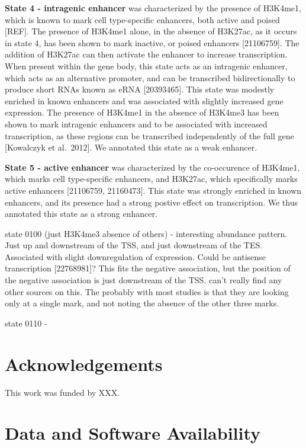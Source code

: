 \documentclass[10pt,letterpaper]{article}
\begin{document}
\textbf{State 4 - intragenic enhancer} was characterized by the presence
of H3K4me1, which is known to mark cell type-specific enhancers, both
active and poised {[}REF{]}. The presence of H3K4me1 alone, in the
absence of H3K27ac, as it occurs in state 4, has been shown to mark
inactive, or poised enhancers {[}21106759{]}. The addition of H3K27ac
can then activate the enhancer to increase transcription. When present
within the gene body, this state acts as an intragenic enhancer, which
acts as an alternative promoter, and can be transcribed bidirectionally
to produce short RNAs known as eRNA {[}20393465{]}. This state was
modestly enriched in known enhancers and was associated with slightly
increased gene expression. The presence of H3K4me1 in the absence of
H3K4me3 has been shown to mark intragenic enhancers and to be associated
with increased transcription, as these regions can be transcribed
independently of the full gene {[}Kowalczyk et al.~2012{]}. We annotated
this state as a weak enhancer.

\textbf{State 5 - active enhancer} was characterized by the co-occurence
of H3K4me1, which marks cell type-specific enhancers, and H3K27ac, which
specifically marks active enhancers {[}21106759, 21160473{]}. This state
was strongly enriched in known enhancers, and its presence had a strong
postive effect on transcription. We thus annotated this state as a
strong enhancer.

state 0100 (just H3K4me3 absence of others) - interesting abundance
pattern. Just up and downstream of the TSS, and just downstream of the
TES. Associated with slight downregulation of expression. Could be
antisense transcription {[}22768981{]}? This fits the negative
association, but the position of the negative association is just
downstream of the TSS. can't really find any other sources on this. The
probably with most studies is that they are looking only at a single
mark, and not noting the absence of the other three marks.

state 0110 -

\hypertarget{acknowledgements}{%
\section{Acknowledgements}\label{acknowledgements}}

This work was funded by XXX.

\hypertarget{data-and-software-availability}{%
\section{Data and Software
Availability}\label{data-and-software-availability}}
\end{document}
